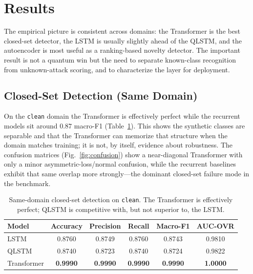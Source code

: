 \documentclass[runningheads]{llncs}
\begin{document}
\section{Results}\label{sec:results}
The empirical picture is consistent across domains: the Transformer is the best closed-set detector, the LSTM is usually slightly ahead of the QLSTM, and the autoencoder is most useful as a ranking-based novelty detector. The important result is not a quantum win but the need to separate known-class recognition from unknown-attack scoring, and to characterize the layer for deployment.

\subsection{Closed-Set Detection (Same Domain)}
On the \texttt{clean} domain the Transformer is effectively perfect while the recurrent models sit around $0.87$ macro-F1 (Table~\ref{tab:clean-inline}). This shows the synthetic classes are separable and that the Transformer can memorize that structure when the domain matches training; it is not, by itself, evidence about robustness. The confusion matrices (Fig.~\ref{fig:confusion}) show a near-diagonal Transformer with only a minor asymmetric-loss/normal confusion, while the recurrent baselines exhibit that same overlap more strongly---the dominant closed-set failure mode in the benchmark.

\begin{table}[t]
\centering
\caption{Same-domain closed-set detection on \texttt{clean}. The Transformer is effectively perfect; QLSTM is competitive with, but not superior to, the LSTM.}
\label{tab:clean-inline}
\begin{tabular}{lccccc}
\toprule
Model & Accuracy & Precision & Recall & Macro-F1 & AUC-OVR \\
\midrule
LSTM        & 0.8760 & 0.8749 & 0.8760 & 0.8743 & 0.9810 \\
QLSTM       & 0.8740 & 0.8723 & 0.8740 & 0.8724 & 0.9822 \\
Transformer & \textbf{0.9990} & \textbf{0.9990} & \textbf{0.9990} & \textbf{0.9990} & \textbf{1.0000} \\
\bottomrule
\end{tabular}
\end{table}
\end{document}
